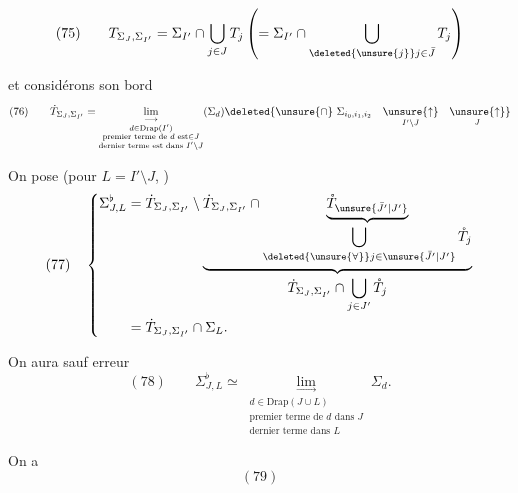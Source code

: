 
\[
(75)\qquad T_{\Sigma_J,\Sigma_{I'}}=\Sigma_{I'}\cap\bigcup_{j\in J}T_j\left(=\Sigma_{I'}\cap\bigcup_{\deleted{\unsure{j}}j\in\bar J}T_j\right)
\]

et considérons son bord
\[
(76)\qquad\dot T_{\Sigma_J,\Sigma_{I'}}=
\underset{\substack{d\in\mathrm{Drap}(I')\\\text{premier terme de }d\text{ est}\in J\\\text{dernier terme est dans }I'\setminus J}}{\lim_{\longrightarrow}}(\Sigma_d)
\deleted{\unsure{\cap}\ \Sigma_{i_0,i_1,i_2}\quad\underset{I'\setminus J}{\unsure{\uparrow}}\quad\underset{J}{\unsure{\uparrow}}}
\]

On pose (pour $L=I'\setminus J$, )
\[
(77)\quad\left\{
\begin{aligned}
\Sigma_{J,L}^{\flat}&=\dot T_{\Sigma_J,\Sigma_{I'}}\setminus
\underbrace{\dot T_{\Sigma_J,\Sigma_{I'}}\cap
\underbrace{\mathring T_{\unsure{\bar J'|J'}}}_{\displaystyle\bigcup_{\deleted{\unsure{\forall}}j\in\unsure{\bar J'|J'}}\mathring T_j}}_{\displaystyle\dot T_{\Sigma_J,\Sigma_{I'}}\cap\bigcup_{j\in J'}\mathring T_j}\\
&=\dot T_{\Sigma_J,\Sigma_{I'}}\cap\Sigma_L.
\end{aligned}\right.
\]

On aura sauf erreur
\[
(78)\qquad\Sigma_{J,L}^{\flat}\simeq
\underset{\substack{d\in\mathrm{Drap}(J\cup L)\\\text{premier terme de }d\text{ dans }J\\\text{dernier terme dans }L}}{\lim_{\longrightarrow}}\Sigma_d.
\]

On a
\[
(79)
\]
